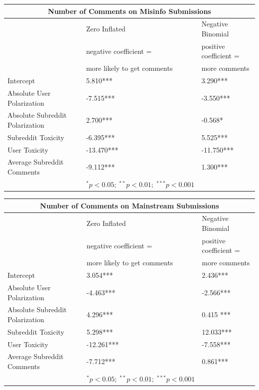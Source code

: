 \begin{table}[b]
\centering
\begin{tabular}{lll}
\toprule
   \multicolumn{3}{c}{\large Number of Comments on Misinfo Submissions}          \\
   \toprule
                                  & {Zero Inflated}  & {Negative Binomial }  \\
                      &       \footnotesize{negative coefficient = } &  \footnotesize{positive coefficient = }\\
                      &       \footnotesize{more likely to get comments} &  \footnotesize{more comments}\\
      \midrule
      Intercept              & 5.810*** & 3.290***  \\               
      \midrule
      Absolute User Polarization               & -7.515***  & -3.550***  \\
      \midrule
      Absolute Subreddit Polarization              & 2.700*** &-0.568* \\
    \midrule
       Subreddit Toxicity & -6.395***   & 5.525*** \\
      \midrule
       User Toxicity &   -13.470*** &  -11.750***\\
      \midrule
      Average Subreddit Comments &  -9.112*** & 1.300***  \\
\bottomrule
& $^\ast p<0.05; \;  ^{**} p<0.01; \; ^{***}p<0.001$ \\

\end{tabular}
\end{table}


\begin{table}[b]
\centering
\begin{tabular}{lll}
\toprule
   \multicolumn{3}{c}{\large Number of Comments on Mainstream Submissions}          \\
   \toprule
                            & {Zero Inflated}  & {Negative Binomial }  \\
                      &       \footnotesize{negative coefficient = } &  \footnotesize{positive coefficient = }\\
                      &       \footnotesize{more likely to get comments} &  \footnotesize{more comments}\\
      \midrule
      Intercept              & 3.054***  &2.436*** \\               
      \midrule
     Absolute User Polarization               & -4.463***  & -2.566***  \\
      \midrule
      Absolute Subreddit Polarization              & 4.296*** &0.415 *** \\
    \midrule
      Subreddit Toxicity & 5.298***  & 12.033*** \\
      \midrule
       User Toxicity &   -12.261*** &  -7.558***\\
      \midrule
      Average Subreddit Comments &  -7.712*** & 0.861***  \\
\bottomrule
& $^\ast p<0.05; \;  ^{**} p<0.01; \; ^{***}p<0.001$ \\
\end{tabular}
\end{table}

